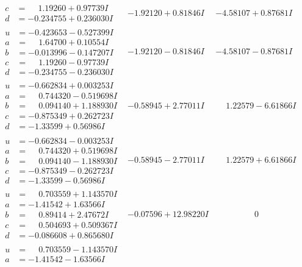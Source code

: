 \documentclass[1p]{elsarticle_modified}
\theoremstyle{definition}
\begin{document}
$$\begin{array}{c|c|c}
\begin{aligned}
c &= \phantom{-}1.19260 + 0.97739 I \\
d &= -0.234755 + 0.236030 I\end{aligned}
 & -1.92120 + 0.81846 I & -4.58107 + 0.87681 I \\ \hline\begin{aligned}
u &= -0.423653 - 0.527399 I \\
a &= \phantom{-}1.64700 + 0.10554 I \\
b &= -0.013996 - 0.147207 I \\
c &= \phantom{-}1.19260 - 0.97739 I \\
d &= -0.234755 - 0.236030 I\end{aligned}
 & -1.92120 - 0.81846 I & -4.58107 - 0.87681 I \\ \hline\begin{aligned}
u &= -0.662834 + 0.003253 I \\
a &= \phantom{-}0.744320 - 0.519698 I \\
b &= \phantom{-}0.094140 + 1.188930 I \\
c &= -0.875349 + 0.262723 I \\
d &= -1.33599 + 0.56986 I\end{aligned}
 & -0.58945 + 2.77011 I & \phantom{-}1.22579 - 6.61866 I \\ \hline\begin{aligned}
u &= -0.662834 - 0.003253 I \\
a &= \phantom{-}0.744320 + 0.519698 I \\
b &= \phantom{-}0.094140 - 1.188930 I \\
c &= -0.875349 - 0.262723 I \\
d &= -1.33599 - 0.56986 I\end{aligned}
 & -0.58945 - 2.77011 I & \phantom{-}1.22579 + 6.61866 I \\ \hline\begin{aligned}
u &= \phantom{-}0.703559 + 1.143570 I \\
a &= -1.41542 + 1.63566 I \\
b &= \phantom{-}0.89414 + 2.47672 I \\
c &= \phantom{-}0.504693 + 0.509367 I \\
d &= -0.086608 + 0.865680 I\end{aligned}
 & -0.07596 + 12.98220 I & \phantom{-0.000000 } 0 \\ \hline\begin{aligned}
u &= \phantom{-}0.703559 - 1.143570 I \\
a &= -1.41542 - 1.63566 I \\

\end{aligned}
\end{array}$$
\end{document}
